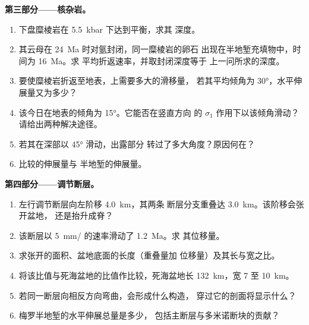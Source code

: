 \begin{problem}
\medskip\noindent\textbf{第三部分——核杂岩。}
\begin{enumerate}[resume]
  \item 下盘糜棱岩在 \qty{5.5}{kbar} 下达到平衡，求其
        深度。
  \item 其云母在 \qty{24}{Ma} 时对氩封闭，同一糜棱岩的卵石
        出现在半地堑充填物中，时间为 \qty{16}{Ma}。求
        平均折返速率，并取封闭深度等于
        上一问所求的深度。
  \item 要使糜棱岩折返至地表，上需要多大的滑移量，
        若其平均倾角为 \ang{30}，水平伸展量又为多少？
  \item 该今日在地表的倾角为 \ang{15}。它能否在竖直方向
        的 $\sigma_1$ 作用下以该倾角滑动？请给出两种解决途径。
  \item 若其在深部以 \ang{45} 滑动，出露部分
        转过了多大角度？原因何在？
  \item 比较的伸展量与
        半地堑的伸展量。
\end{enumerate}

\medskip\noindent\textbf{第四部分——调节断层。}
\begin{enumerate}[resume]
  \item 左行调节断层向左阶移 \qty{4.0}{km}，其两条
        断层分支重叠达 \qty{3.0}{km}。该阶移会张开盆地，
        还是抬升成脊？
  \item 该断层以 \qty{5}{mm/} 的速率滑动了 \qty{1.2}{Ma}。求
        其位移量。
  \item 求张开的面积、盆地底面的长度（重叠量加
        位移量）及其长与宽之比。
  \item 将该比值与死海盆地的比值作比较，死海盆地长 \qty{132}{km}，宽 7
        至 \qty{10}{km}。
  \item 若同一断层向相反方向弯曲，会形成什么构造，
        穿过它的剖面将显示什么？
  \item 梅罗半地堑的水平伸展总量是多少，
        包括主断层与多米诺断块的贡献？
\end{enumerate}
\end{problem}
